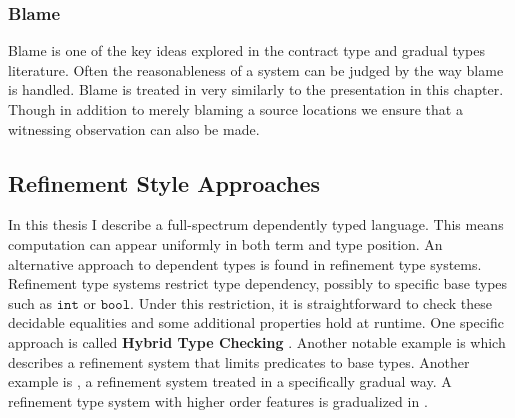 \subsubsection{Blame}

Blame is one of the key ideas explored in the contract type and gradual
types literature\cite{10.1007/978-3-642-00590-9_1,wadler:LIPIcs:2015:5033,10.1145/3110283}.
Often the reasonableness of a system can be judged by the way blame
is handled\cite{wadler:LIPIcs:2015:5033}. Blame is treated in \cite{wadler:LIPIcs:2015:5033}
very similarly to the presentation in this chapter. Though in addition
to merely blaming a source locations we ensure that a witnessing observation
can also be made.

\subsection{Refinement Style Approaches}

In this thesis I describe a full-spectrum dependently typed language.
This means computation can appear uniformly in both term and type
position. An alternative approach to dependent types is found in refinement
type systems. Refinement type systems restrict type dependency, possibly
to specific base types such as $\mathtt{int}$ or $\mathtt{bool}$.
Under this restriction, it is straightforward to check these decidable
equalities and some additional properties hold at runtime. One specific
approach is called \textbf{Hybrid Type Checking} \cite{10.1145/1111037.1111059}.
Another notable example is \cite{10.1007/1-4020-8141-3_34} which
describes a refinement system that limits predicates to base types.
Another example is \cite{10.1145/3093333.3009856}, a refinement system
treated in a specifically gradual way. A refinement type system with
higher order features is gradualized in \cite{c4be73a0daf74c9aa4d13483a2c4dd0e}.

